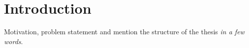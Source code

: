 \chapter{Introduction}
\label{sec:introduction}

Motivation, problem statement and mention the structure of the thesis \textit{in a few words}.
